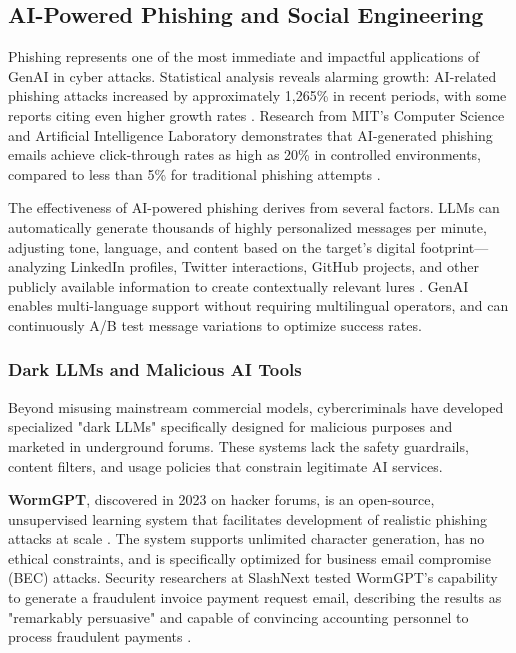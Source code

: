 \subsection{AI-Powered Phishing and Social Engineering}

Phishing represents one of the most immediate and impactful applications of GenAI in cyber attacks. Statistical analysis reveals alarming growth: AI-related phishing attacks increased by approximately 1,265\% in recent periods, with some reports citing even higher growth rates \cite{deepstrike2025}. Research from MIT's Computer Science and Artificial Intelligence Laboratory demonstrates that AI-generated phishing emails achieve click-through rates as high as 20\% in controlled environments, compared to less than 5\% for traditional phishing attempts \cite{reddit2025}.

The effectiveness of AI-powered phishing derives from several factors. LLMs can automatically generate thousands of highly personalized messages per minute, adjusting tone, language, and content based on the target's digital footprint—analyzing LinkedIn profiles, Twitter interactions, GitHub projects, and other publicly available information to create contextually relevant lures \cite{reddit2025}. GenAI enables multi-language support without requiring multilingual operators, and can continuously A/B test message variations to optimize success rates.

\subsubsection{Dark LLMs and Malicious AI Tools}

Beyond misusing mainstream commercial models, cybercriminals have developed specialized "dark LLMs" specifically designed for malicious purposes and marketed in underground forums. These systems lack the safety guardrails, content filters, and usage policies that constrain legitimate AI services.

\textbf{WormGPT}, discovered in 2023 on hacker forums, is an open-source, unsupervised learning system that facilitates development of realistic phishing attacks at scale \cite{scadafence2024}. The system supports unlimited character generation, has no ethical constraints, and is specifically optimized for business email compromise (BEC) attacks. Security researchers at SlashNext tested WormGPT's capability to generate a fraudulent invoice payment request email, describing the results as "remarkably persuasive" and capable of convincing accounting personnel to process fraudulent payments \cite{eftsure2025}.

